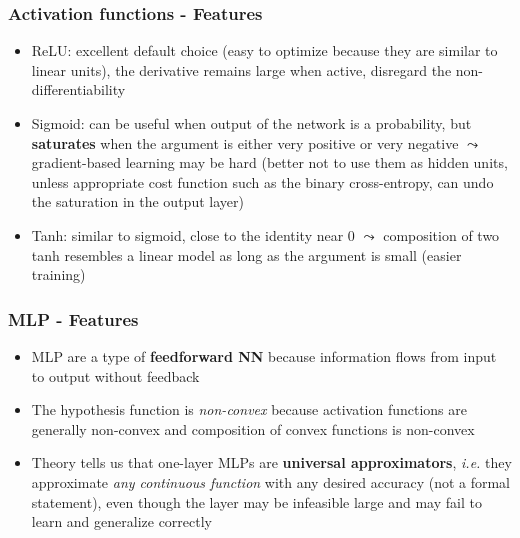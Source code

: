 \documentclass{beamer}
\begin{document}
\begin{frame}
\begin{figure}
			\qquad
		\end{figure}
	\end{frame}
	
	\begin{frame}
		\frametitle{Activation functions - Features}
		\begin{itemize}
			\item ReLU: excellent default choice (easy to optimize because they are similar to linear units), the derivative remains large when active,  disregard the non-differentiability
			\item Sigmoid: can be useful when output of the network is a probability, but \textbf{saturates} when the argument is either very positive or very negative $\leadsto$ gradient-based learning may be hard (better not to use them as hidden units, unless appropriate cost function such as the binary cross-entropy, can undo the saturation in the output layer)
			\item Tanh: similar to sigmoid, close to the identity near 0 $\leadsto$ composition of two tanh resembles a linear model as long as the argument is small (easier training)
		\end{itemize}
	\end{frame}

	\begin{frame}
	\frametitle{MLP - Features}
	\begin{itemize}
		\setlength\itemsep{5mm}
		\item MLP are a type of \textbf{feedforward NN} because information flows from input to output without feedback
		\item The hypothesis function is \textit{non-convex} because activation functions are generally non-convex and composition of convex functions is non-convex
		\item Theory tells us that one-layer MLPs are \textbf{universal approximators}, \textit{i.e.} they approximate \textit{any continuous function} with any desired accuracy (not a formal statement), even though the layer may be infeasible large and may fail to learn and generalize correctly
	\end{itemize}
\end{frame}
\end{document}
